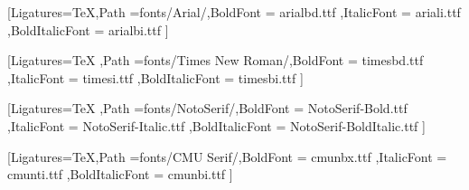 \usepackage{ifthen}

\usepackage{geometry}\geometry{
    a4paper, %
    left=40mm,
    right=20mm,
    top=25mm,
    bottom=25mm,
    footskip=10mm,
    headheight=20mm %
}

\renewcommand*{\chapterheadstartvskip}{\vspace*{0mm}}

\usepackage{verbatim}

\usepackage{fontspec}

{
    \setmainfont{arial.ttf}[Ligatures=TeX,Path =fonts/Arial/,BoldFont = arialbd.ttf ,ItalicFont = ariali.ttf ,BoldItalicFont = arialbi.ttf ]
}{}

{
    \setmainfont{times.ttf}[Ligatures=TeX ,Path =fonts/Times New Roman/,BoldFont = timesbd.ttf ,ItalicFont = timesi.ttf ,BoldItalicFont = timesbi.ttf ]
}{}

{
    \setmainfont{NotoSerif-Regular.ttf}[Ligatures=TeX ,Path =fonts/NotoSerif/,BoldFont = NotoSerif-Bold.ttf ,ItalicFont = NotoSerif-Italic.ttf ,BoldItalicFont = NotoSerif-BoldItalic.ttf ]
}{}

{
    \setmainfont{cmunrm.ttf}[Ligatures=TeX,Path =fonts/CMU Serif/,BoldFont = cmunbx.ttf ,ItalicFont = cmunti.ttf ,BoldItalicFont = cmunbi.ttf ]
}

\renewcommand{\baselinestretch}{1.5}

\usepackage[ngerman]{babel}
\usepackage{csquotes}

\parindent0pt



